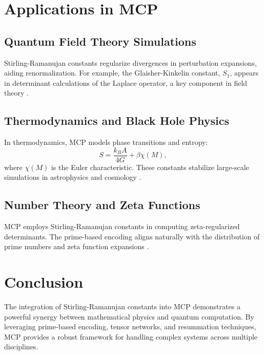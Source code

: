 \documentclass{article}
\theoremstyle{plain}
\begin{document}
\section{Applications in MCP}

\subsection{Quantum Field Theory Simulations}
Stirling-Ramanujan constants regularize divergences in perturbation expansions, aiding renormalization. For example, the Glaisher-Kinkelin constant, $S_1$, appears in determinant calculations of the Laplace operator, a key component in field theory \cite{Hardy1949}.

\subsection{Thermodynamics and Black Hole Physics}
In thermodynamics, MCP models phase transitions and entropy:
\begin{equation}
S = \frac{k_B A}{4 G} + \beta \chi(M),
\end{equation}
where $\chi(M)$ is the Euler characteristic. These constants stabilize large-scale simulations in astrophysics and cosmology \cite{Bekenstein1973, Hawking1975}.

\subsection{Number Theory and Zeta Functions}
MCP employs Stirling-Ramanujan constants in computing zeta-regularized determinants. The prime-based encoding aligns naturally with the distribution of prime numbers and zeta function expansions \cite{Lagarias2013}.

\section{Conclusion}
The integration of Stirling-Ramanujan constants into MCP demonstrates a powerful synergy between mathematical physics and quantum computation. By leveraging prime-based encoding, tensor networks, and resummation techniques, MCP provides a robust framework for handling complex systems across multiple disciplines.



\end{document}
